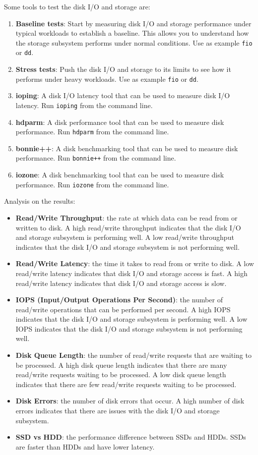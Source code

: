 Some tools to test the disk I/O and storage are:
\begin{enumerate}
    \item \textbf{Baseline tests}: Start by measuring disk I/O and storage performance under typical workloads to establish a baseline. This allows you to understand how the storage subsystem performs under normal conditions. Use as example \texttt{fio} or \texttt{dd}.
    \item \textbf{Stress tests}: Push the disk I/O and storage to its limits to see how it performs under heavy workloads. Use as example \texttt{fio} or \texttt{dd}.
    \item \textbf{ioping}: A disk I/O latency tool that can be used to measure disk I/O latency. Run \texttt{ioping} from the command line.
    \item \textbf{hdparm}: A disk performance tool that can be used to measure disk performance. Run \texttt{hdparm} from the command line.
    \item \textbf{bonnie++}: A disk benchmarking tool that can be used to measure disk performance. Run \texttt{bonnie++} from the command line.
    \item \textbf{iozone}: A disk benchmarking tool that can be used to measure disk performance. Run \texttt{iozone} from the command line.
\end{enumerate}

Analysis on the results:
\begin{itemize}
    \item \textbf{Read/Write Throughput}: the rate at which data can be read from or written to disk. A high read/write throughput indicates that the disk I/O and storage subsystem is performing well. A low read/write throughput indicates that the disk I/O and storage subsystem is not performing well.
    \item \textbf{Read/Write Latency}: the time it takes to read from or write to disk. A low read/write latency indicates that disk I/O and storage access is fast. A high read/write latency indicates that disk I/O and storage access is slow.
    \item \textbf{IOPS (Input/Output Operations Per Second)}: the number of read/write operations that can be performed per second. A high IOPS indicates that the disk I/O and storage subsystem is performing well. A low IOPS indicates that the disk I/O and storage subsystem is not performing well.
    \item \textbf{Disk Queue Length}: the number of read/write requests that are waiting to be processed. A high disk queue length indicates that there are many read/write requests waiting to be processed. A low disk queue length indicates that there are few read/write requests waiting to be processed.
    \item \textbf{Disk Errors}: the number of disk errors that occur. A high number of disk errors indicates that there are issues with the disk I/O and storage subsystem.
    \item \textbf{SSD vs HDD}: the performance difference between SSDs and HDDs. SSDs are faster than HDDs and have lower latency.
\end{itemize}




